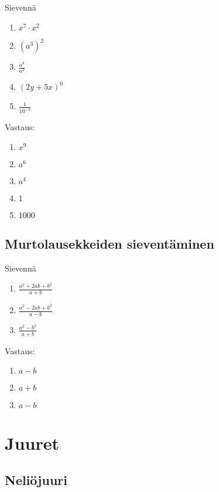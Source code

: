 \begin{esimerkki}
\begin{tehtava}
Sievennä
\begin{enumerate}
\item $x^7\cdot x^2$
\item $(a^3)^2$
\item $\frac{a^8}{a^2}$
\item $(2y+5x)^0$
\item $\frac{1}{10^{-3}}$
\end{enumerate}
\begin{vastaus}
Vastaus:
\begin{enumerate}
\item $x^9$
\item $a^6$
\item $a^4$
\item $1$
\item $1000$
\end{enumerate}
\end{vastaus}
\end{tehtava}

\section{Murtolausekkeiden sieventäminen}

\begin{tehtava}
Sievennä
\begin{enumerate}
\item $\frac{a^2+2ab+b^2}{a+b}$
\item $\frac{a^2-2ab+b^2}{a-b}$
\item $\frac{a^2-b^2}{a+b}$
\end{enumerate}
\begin{vastaus}
Vastaus:
\begin{enumerate}
\item $a-b$
\item $a+b$
\item $a-b$
\end{enumerate}
\end{vastaus}
\end{tehtava}

\chapter{Juuret}

\section{Neliöjuuri}


\end{esimerkki}
